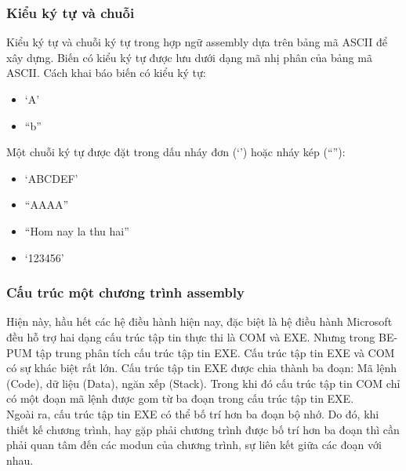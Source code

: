 	\subsubsection*{Kiểu ký tự và chuỗi}
	Kiểu ký tự và chuỗi ký tự trong hợp ngữ assembly dựa trên bảng mã ASCII để xây dựng. Biến có kiểu ký tự được lưu dưới dạng mã nhị phân của bảng mã ASCII. 
	Cách khai báo biến có kiểu ký tự:
	\begin{itemize}
		\item	‘A’ 
		\item	“b” 
	\end{itemize}
	Một chuỗi ký tự được đặt trong dấu nháy đơn (‘’)  hoặc nháy kép (“”):
	\begin{itemize}		
		 \item  ‘ABCDEF’
		\item	“AAAA”
		\item	“Hom nay la thu hai”
		\item	‘123456’ 
	\end{itemize}	
		
		\subsubsection{Cấu trúc một chương trình assembly}
			Hiện này, hầu hết các hệ điều hành hiện nay, đặc biệt là hệ điều hành Microsoft đều hỗ trợ hai dạng cấu trúc tập tin thực thi là COM và EXE. Nhưng trong BE-PUM tập trung phân tích cấu trúc tập tin EXE. Cấu trúc tập tin EXE và COM có sự khác biệt rất lớn. Cấu trúc tập tin EXE được chia thành ba đoạn: Mã lệnh (Code), dữ liệu (Data), ngăn xếp (Stack). Trong khi đó cấu trúc tập tin COM chỉ có một đoạn mã lệnh được gom từ ba đoạn trong cấu trúc tập tin EXE. \\

Ngoài ra, cấu trúc tập tin EXE có thể bố trí hơn ba đoạn bộ nhớ. Do đó, khi thiết kế chương trình, hay gặp phải chương trình được bố trí hơn ba đoạn thì cần phải quan tâm đến các modun của chương trình, sự liên kết giữa các đoạn với nhau. \\

